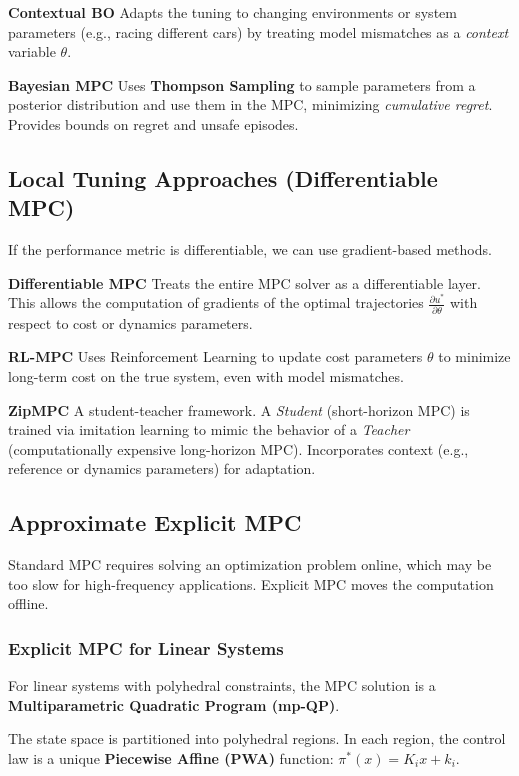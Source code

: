\textbf{Contextual BO}
Adapts the tuning to changing environments or system parameters
(e.g., racing different cars)
by treating model mismatches as a \textit{context} variable $\theta$.

\textbf{Bayesian MPC}
Uses \textbf{Thompson Sampling} to sample parameters
from a posterior distribution and use them in the MPC,
minimizing \textit{cumulative regret}.
Provides bounds on regret and unsafe episodes.

\subsection{Local Tuning Approaches (Differentiable MPC)}

If the performance metric is differentiable,
we can use gradient-based methods.

\textbf{Differentiable MPC}
Treats the entire MPC solver as a differentiable layer.
This allows the computation of gradients of the
optimal trajectories $\frac{\partial u^*}{\partial \theta}$
with respect to cost or dynamics parameters.

\textbf{RL-MPC}
Uses Reinforcement Learning to update cost parameters $\theta$
to minimize long-term cost on the true system,
even with model mismatches.

\textbf{ZipMPC}
A student-teacher framework.
A \textit{Student} (short-horizon MPC) is trained via imitation learning
to mimic the behavior of a \textit{Teacher}
(computationally expensive long-horizon MPC).
Incorporates context (e.g., reference or dynamics parameters) for adaptation.

\subsection{Approximate Explicit MPC}

Standard MPC requires solving an optimization problem online, which
may be too slow for high-frequency applications. Explicit MPC moves
the computation offline.

\subsubsection{Explicit MPC for Linear Systems}

For linear systems with polyhedral constraints,
the MPC solution is a \textbf{Multiparametric Quadratic Program (mp-QP)}.

The state space is partitioned into polyhedral regions.
In each region,
the control law is a unique \textbf{Piecewise Affine (PWA)} function:
$\pi^*(x) = K_i x + k_i$.

